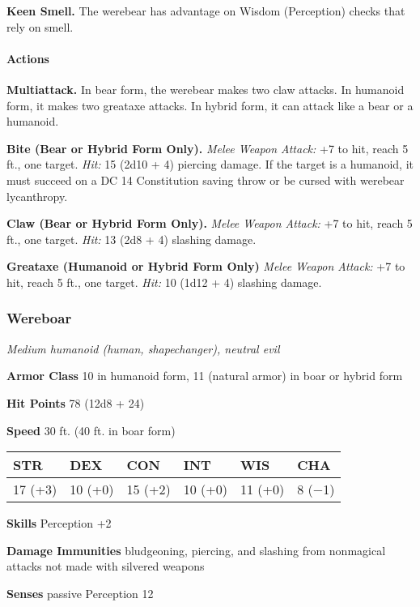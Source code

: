 \documentclass[
]{article}
\begin{document}
\textbf{Keen Smell.} The werebear has advantage on Wisdom (Perception)
checks that rely on smell.

\hypertarget{actions-3}{%
\paragraph{Actions}\label{actions-3}}

\textbf{Multiattack.} In bear form, the werebear makes two claw attacks.
In humanoid form, it makes two greataxe attacks. In hybrid form, it can
attack like a bear or a humanoid.

\textbf{Bite (Bear or Hybrid Form Only).} \emph{Melee Weapon Attack:} +7
to hit, reach 5 ft., one target. \emph{Hit:} 15 (2d10 + 4) piercing
damage. If the target is a humanoid, it must succeed on a DC 14
Constitution saving throw or be cursed with werebear lycanthropy.

\textbf{Claw (Bear or Hybrid Form Only).} \emph{Melee Weapon Attack:} +7
to hit, reach 5 ft., one target. \emph{Hit:} 13 (2d8 + 4) slashing
damage.

\textbf{Greataxe (Humanoid or Hybrid Form Only)} \emph{Melee Weapon
Attack:} +7 to hit, reach 5 ft., one target. \emph{Hit:} 10 (1d12 + 4)
slashing damage.

\hypertarget{wereboar}{%
\subsubsection{Wereboar}\label{wereboar}}

\emph{Medium humanoid (human, shapechanger), neutral evil}

\textbf{Armor Class} 10 in humanoid form, 11 (natural armor) in boar or
hybrid form

\textbf{Hit Points} 78 (12d8 + 24)

\textbf{Speed} 30 ft. (40 ft. in boar form)

\begin{longtable}[]{@{}llllll@{}}
\toprule
STR & DEX & CON & INT & WIS & CHA\tabularnewline
\midrule
\endhead
17 (+3) & 10 (+0) & 15 (+2) & 10 (+0) & 11 (+0) & 8 (−1)\tabularnewline
\bottomrule
\end{longtable}

\textbf{Skills} Perception +2

\textbf{Damage Immunities} bludgeoning, piercing, and slashing from
nonmagical attacks not made with silvered weapons

\textbf{Senses} passive Perception 12
\end{document}
